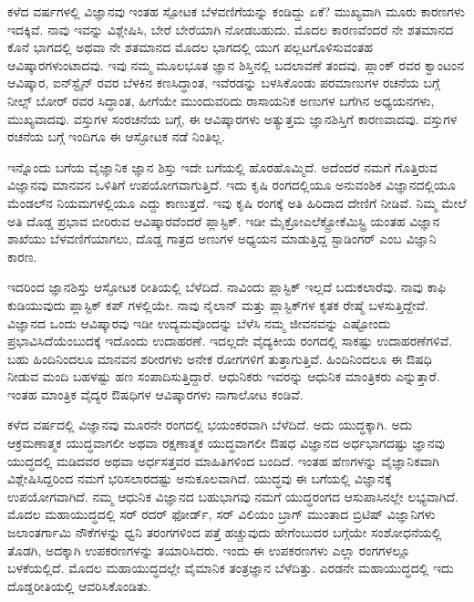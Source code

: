 
ಕಳೆದ  ವರ್ಷಗಳಲ್ಲಿ ವಿಜ್ಞಾನವು ಇಂತಹ ಸ್ಪೋಟಕ ಬೆಳವಣಿಗೆಯನ್ನು ಕಂಡಿದ್ದು ಏಕೆ? ಮುಖ್ಯವಾಗಿ ಮೂರು ಕಾರಣಗಳು ಇದಕ್ಕಿವೆ. ನಾವು ಇವನ್ನು ವಿಶ್ಲೇಷಿಸಿ, ಬೇರೆ ಬೇರೆಯಾಗಿ ನೋಡಬಹುದು. ಮೊದಲ ಕಾರಣವೆಂದರೆ ನೇ ಶತಮಾನದ ಕೊನೆ ಭಾಗದಲ್ಲಿ ಅಥವಾ ನೇ ಶತಮಾನದ ಮೊದಲ ಭಾಗದಲ್ಲಿ ಯುಗ ಪಲ್ಲಟಗೊಳಿಸುವಂತಹ ಆವಿಷ್ಕಾರಗಳುಂಟಾದವು. ಇವು ನಮ್ಮ ಮೂಲಭೂತ ಜ್ಞಾನ ಶಿಸ್ತಿನಲ್ಲಿ ಬದಲಾವಣೆ ತಂದವು. ಪ್ಲಾಂಕ್ ರವರ ಕ್ವಾಂಟಂನ ಆವಿಷ್ಕಾರ, ಐನ್‍ಸ್ಟೈನ್ ರವರ ಬೆಳಕಿನ ಕಣಸಿದ್ಧಾಂತ, ಇವೆರಡನ್ನು ಬಳಸಿಕೊಂಡು ಪರಮಾಣುಗಳ ರಚನೆಯ ಬಗ್ಗೆ ನೀಲ್ಸ್ ಬೋರ್ ರವರ ಸಿದ್ಧಾಂತ, ಹೀಗೆಯೇ ಮುಂದುವರಿದು ರಾಸಾಯನಿಕ ಅಣುಗಳ ಬಗೆಗಿನ ಅಧ್ಯಯನಗಳು, ಮುಖ್ಯವಾದವು. ವಸ್ತುಗಳ ಸಂರಚನೆಯ ಬಗ್ಗೆ, ಈ ಆವಿಷ್ಕಾರಗಳು ಅತ್ಯುತ್ತಮ ಜ್ಞಾನಶಿಸ್ತಿಗೆ ಕಾರಣವಾದವು. ವಸ್ತುಗಳ ರಚನೆಯ ಬಗ್ಗೆ ಇಂದಿಗೂ ಈ ಆಸ್ಫೋಟಕ ನಡೆ ನಿಂತಿಲ್ಲ.

ಇನ್ನೊಂದು ಬಗೆಯ ವೈಜ್ಞಾನಿಕ ಜ್ಞಾನ ಶಿಸ್ತು ಇದೇ ಬಗೆಯಲ್ಲಿ ಹೊರಹೊಮ್ಮಿದೆ. ಅದೆಂದರೆ ನಮಗೆ ಗೊತ್ತಿರುವ ವಿಜ್ಞಾನವು ಮಾನವನ ಒಳಿತಿಗೆ ಉಪಯೋಗವಾಗುತ್ತಿದೆ. ಇದು ಕೃಷಿ ರಂಗದಲ್ಲಿಯೂ ಅನುವಂಶಿಕ ವಿಜ್ಞಾನದಲ್ಲಿಯೂ ಮೆಂಡಲ್‍ನ ನಿಯಮಗಳಲ್ಲಿಯೂ ಎದ್ದು ಕಾಣುತ್ತದೆ. ಇವು ಕೃಷಿ ರಂಗಕ್ಕೆ ಅತಿ ಹಿರಿದಾದ ದೇಣಿಗೆ ನೀಡಿವೆ. ನಿಮ್ಮ ಮೇಲೆ ಅತಿ ದೊಡ್ಡ ಪ್ರಭಾವ ಬೀರಿರುವ ಆವಿಷ್ಕಾರವೆಂದರೆ ಪ್ಲಾಸ್ಟಿಕ್. ಇಡೀ ಮೈಕ್ರೋ\enginline{-}ಎಲೆಕ್ಟ್ರೋಕೆಮಿಸ್ಟ್ರಿ ಯಂತಹ ವಿಜ್ಞಾನ ಶಾಖೆಯು ಬೆಳವಣಿಗೆಯಾಗಲು, ದೊಡ್ಡ ಗಾತ್ರದ ಅಣುಗಳ ಅಧ್ಯಯನ ಮಾಡುತ್ತಿದ್ದ ಸ್ಟಾಡಿಂಗರ್ ಎಂಬ ವಿಜ್ಞಾನಿ ಕಾರಣ.

ಇದರಿಂದ ಜ್ಞಾನಶಿಸ್ತು ಆಸ್ಫೋಟಕ ರೀತಿಯಲ್ಲಿ ಬೆಳೆದಿದೆ. ನಾವಿಂದು ಪ್ಲಾಸ್ಟಿಕ್ ಇಲ್ಲದೆ ಬದುಕಲಾರೆವು. ನಾವು ಕಾಫಿ ಕುಡಿಯುವುದು ಪ್ಲಾಸ್ಟಿಕ್ ಕಪ್ ಗಳಲ್ಲಿಯೇ. ನಾವು ನೈಲಾನ್ ಮತ್ತು ಪ್ಲಾಸ್ಟಿಕ್‍ಗಳ ಕೃತಕ ರೇಷ್ಮೆ ಬಳಸುತ್ತಿದ್ದೇವೆ. ವಿಜ್ಞಾನದ ಒಂದು ಆವಿಷ್ಕಾರವು ಇಡೀ ಉದ್ಯಮವೊಂದನ್ನು ಬೆಳೆಸಿ ನಮ್ಮ ಜೀವನವನ್ನು ಎಷ್ಟೋಂದು ಪ್ರಭಾವಿಸಿದೆಯೆಂಬುದಕ್ಕೆ ಇದೊಂದು ಉದಾಹರಣೆ. ಇದಲ್ಲದೇ ವೈದ್ಯಕೀಯ ರಂಗದಲ್ಲಿ ಸಾಕಷ್ಟು ಉದಾಹರಣೆಗಳಿವೆ. ಬಹು ಹಿಂದಿನಿಂದಲೂ ಮಾನವನ ಶರೀರಗಳು ಅನೇಕ ರೋಗಗಳಿಗೆ ತುತ್ತಾಗುತ್ತಿವೆ. ಹಿಂದಿನಿಂದಲೂ ಈ ಔಷಧಿ ನೀಡುವ ಮಂದಿ ಬಹಳಷ್ಟು ಹಣ ಸಂಪಾದಿಸುತ್ತಿದ್ದಾರೆ. ಆಧುನಿಕರು ಇವರನ್ನು ಆಧುನಿಕ ಮಾಂತ್ರಿಕರು ಎನ್ನುತ್ತಾರೆ. ಇಂತಹ ಮಾಂತ್ರಿಕ ವೈದ್ಯರ ಔಷಧಿಗಳ ಆವಿಷ್ಕಾರಗಳು ನಾಗಾಲೋಟ ಕಂಡಿವೆ.

ಕಳೆದ  ವರ್ಷದಲ್ಲಿ ವಿಜ್ಞಾನವು ಮೂರನೇ ರಂಗದಲ್ಲಿ ಭಯಂಕರವಾಗಿ ಬೆಳೆದಿದೆ. ಅದು ಯುದ್ಧಕ್ಕಾಗಿ. ಅದು ಆಕ್ರಮಣಾತ್ಮಕ ಯುದ್ಧವಾಗಲೀ ಅಥವಾ ರಕ್ಷಣಾತ್ಮಕ ಯುದ್ಧವಾಗಲೀ ಔಷಧ ವಿಜ್ಞಾನದ ಅರ್ಧಭಾಗದಷ್ಟು ಜ್ಞಾನವು ಯುದ್ಧದಲ್ಲಿ ಮಡಿದವರ ಅಥವಾ ಅರ್ಧಸತ್ತವರ ಮಾಹಿತಿಗಳಿಂದ ಬಂದಿದೆ. ಇಂತಹ ಹೆಣಗಳನ್ನು ವೈಜ್ಞಾನಿಕವಾಗಿ ವಿಶ್ಲೇಷಿಸಿದ್ದರಿಂದ ನಮಗೆ ಭರಿಸಲಾರದಷ್ಟು ಅನುಕೂಲವಾಗಿದೆ. ಯುದ್ಧವು ಈ ಬಗೆಯಲ್ಲಿ ವಿಜ್ಞಾನಕ್ಕೆ ಉಪಯೋಗವಾಗಿದೆ. ನಮ್ಮ ಆಧುನಿಕ ವಿಜ್ಞಾನದ ಬಹುಭಾಗವು ನಮಗೆ ಯುದ್ಧರಂಗದ ಆಸುಪಾಸಿನಲ್ಲೇ ಲಭ್ಯವಾಗಿದೆ. ಮೊದಲ ಮಹಾಯುದ್ಧದಲ್ಲಿ ಸರ್ ರದರ್ ಫೋರ್ಡ್, ಸರ್ ವಿಲಿಯಂ ಬ್ರಾಗ್ ಮುಂತಾದ ಬ್ರಿಟಿಷ್ ವಿಜ್ಞಾನಿಗಳು ಜಲಾಂತರ್ಗಾಮಿ ನೌಕೆಗಳನ್ನು ಧ್ವನಿ ತರಂಗಗಳಿಂದ ಪತ್ತೆ ಹಚ್ಚುವುದು ಹೇಗೆಂಬುದರ ಬಗ್ಗೆಯೇ ಸಂಶೋಧನೆಯಲ್ಲಿ ತೊಡಗಿ, ಅದಕ್ಕಾಗಿ ಉಪಕರಣಗಳನ್ನು ತಯಾರಿಸಿದರು. ಇಂದು ಈ ಉಪಕರಣಗಳು ಎಲ್ಲಾ ರಂಗಗಳಲ್ಲೂ ಬಳಕೆಯಲ್ಲಿದೆ. ಮೊದಲ ಮಹಾಯುದ್ಧದಲ್ಲೇ ವೈಮಾನಿಕ ತಂತ್ರಜ್ಞಾನ ಬೆಳೆದಿತ್ತು. ಎರಡನೇ ಮಹಾಯುದ್ಧದಲ್ಲಿ ಇದು ದೊಡ್ಡರೀತಿಯಲ್ಲಿ ಆವರಿಸಿಕೊಂಡಿತು.

